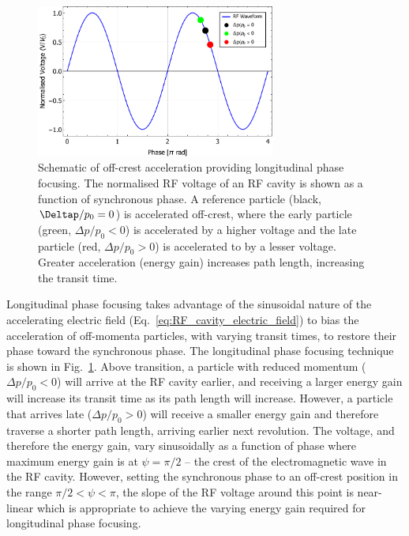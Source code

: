 \documentclass[../main.tex]{subfiles}
\begin{document}
\begin{figure}[!h]
\centering
\includegraphics[width=0.7\textwidth]{Figures/Energy_Recovery_Linac_Design/Above_Transition_Phase_Focusing.pdf}
\caption{Schematic of off-crest acceleration providing longitudinal phase focusing. The normalised RF voltage of an RF cavity is shown as a function of synchronous phase. A reference particle (black, $\Deltap/p_{0}=0$) is accelerated off-crest, where the early particle (green, $\Delta p/p_{0}<0$) is accelerated by a higher voltage and the late particle (red, $\Delta p/p_{0}>0$) is accelerated to by a lesser voltage. Greater acceleration (energy gain) increases path length, increasing the transit time. }
\label{fig:phase_focusing_above_transition}
\end{figure}

Longitudinal phase focusing takes advantage of the sinusoidal nature of the accelerating electric field (Eq.~\ref{eq:RF_cavity_electric_field}) to bias the acceleration of off-momenta particles, with varying transit times, to restore their phase toward the synchronous phase. The longitudinal phase focusing technique is shown in Fig.~\ref{fig:phase_focusing_above_transition}. Above transition, a particle with reduced momentum ($\Delta p/p_{0}<0$) will arrive at the RF cavity earlier, and receiving a larger energy gain will increase its transit time  as its path length will increase. However, a particle that arrives late ($\Delta p/p_{0}>0$) will receive a smaller energy gain and therefore traverse a shorter path length, arriving earlier next revolution.
The voltage, and therefore the energy gain, vary sinusoidally as a function of phase where maximum energy gain is at $\psi=\pi/2$ -- the crest of the electromagnetic wave in the RF cavity. However, setting the synchronous phase to an off-crest position in the range $\pi/2<\psi<\pi$, the slope of the RF voltage around this point is near-linear which is appropriate to achieve the varying energy gain required for longitudinal phase focusing.  
\end{document}
